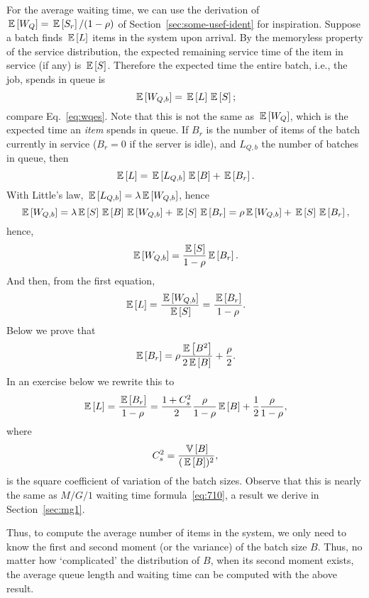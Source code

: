 For the average waiting time, we can use the derivation of
$\,\mathbb{E}\left[W_Q\right]=\,\mathbb{E}\left[S_r\right]/(1-\rho)$ of Section~\ref{sec:some-usef-ident} for
inspiration. Suppose a batch finds $\,\mathbb{E}\left[L\right]$ items in the system upon
arrival. By the memoryless property of the service distribution, the
expected remaining service time of the item in service (if any) is
$\,\mathbb{E}\left[S\right]$. Therefore the expected time the entire batch, i.e., the job,
spends in queue is
\begin{equation*}
  \,\mathbb{E}\left[W_{Q,b}\right] = \,\mathbb{E}\left[L\right] \,\mathbb{E}\left[S\right];
\end{equation*}
compare Eq.~\ref{eq:wqes}. Note that this is not the same as
$\,\mathbb{E}\left[W_Q\right]$, which is the expected time an \emph{item} spends in queue.
If $B_r$ is the number of items of the batch currently in service
($B_r=0$ if the server is idle), and $L_{Q,b}$ the number of batches
in queue, then
\begin{equation*}
  \,\mathbb{E}\left[L\right] = \,\mathbb{E}\left[L_{Q,b}\right]\,\mathbb{E}\left[B\right] + \,\mathbb{E}\left[B_r\right].
\end{equation*}
With  Little's law, $\,\mathbb{E}\left[L_{Q,b}\right] = \lambda \,\mathbb{E}\left[W_{Q,b}\right]$, hence
\begin{equation*}
  \,\mathbb{E}\left[W_{Q,b}\right] = \lambda \,\mathbb{E}\left[S\right] \,\mathbb{E}\left[B\right] \,\mathbb{E}\left[W_{Q,b}\right] + \,\mathbb{E}\left[S\right] \,\mathbb{E}\left[B_r\right] = \rho \,\mathbb{E}\left[W_{Q,b}\right] + \,\mathbb{E}\left[S\right] \,\mathbb{E}\left[B_r\right],
\end{equation*}
hence,
\begin{equation*}
  \,\mathbb{E}\left[W_{Q,b}\right] = \frac{\,\mathbb{E}\left[S\right]}{1-\rho}\,\mathbb{E}\left[B_r\right].
\end{equation*}
And then, from the first equation, 
\begin{equation*}
  \,\mathbb{E}\left[L\right] = \frac{\,\mathbb{E}\left[W_{Q,b}\right]}{\,\mathbb{E}\left[S\right]} = \frac{\,\mathbb{E}\left[B_r\right]}{1-\rho}.
\end{equation*}
Below we prove that 
\begin{equation}\label{eq:br}
  \,\mathbb{E}\left[B_r\right] = \rho\frac{\,\mathbb{E}\left[B^2\right]}{2\,\mathbb{E}\left[B\right]} + \frac\rho2.
\end{equation}
In an exercise below we rewrite this to
\begin{equation}\label{eq:43}
\,\mathbb{E}\left[L\right]  = \frac{\,\mathbb{E}\left[B_r\right]}{1-\rho} = \frac{1+C_s^2}2 \frac{\rho}{1-\rho} \,\mathbb{E}\left[B\right] + \frac12\frac\rho{1-\rho},
\end{equation}
where
\begin{equation*}
C_s^2 = \frac{\,\mathbb{V}\left[B\right]}{(\,\mathbb{E}\left[B\right])^2},
\end{equation*}
is the square coefficient of variation of the batch sizes.  Observe
that this is nearly the same as $M/G/1$ waiting time
formula~\ref{eq:710}, a result we derive in Section~\ref{sec:mg1}. 

Thus, to compute the average number of items in the system, we only
need to know the first and second moment (or the variance) of the
batch size $B$. Thus, no matter how `complicated' the distribution of
$B$, when its second moment exists, the average queue length and
waiting time can be computed with the above result. 



